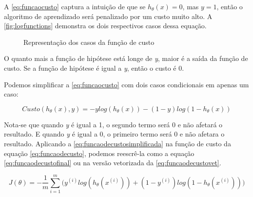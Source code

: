 A \autoref{eq:funcaocusto} captura a intuição de que se $h_\theta(x) = 0$, mas $y = 1$, então o algoritmo de aprendizado será penalizado por um custo muito alto. A \autoref{fig:logfunctions} demonstra os dois respectivos casos dessa equação.


\begin{figure}[!htb]
  \caption{Representação dos casos da função de custo}
  \label{fig:logfunctions}
  \begin{center}
  \end{center}
\end{figure}


O quanto mais a função de hipótese está longe de \textit{y}, maior é a saída da função de custo. Se a função de hipótese é igual a \textit{y}, então o custo é 0.

Podemos simplificar a \autoref{eq:funcaocusto} com dois casos condicionais em apenas um caso:

\begin{equation} 
\label{eq:funcaodecustosimplificada}
Custo(h_{\theta}(x), y) = -ylog(h_{\theta}(x)) - (1-y)log(1 - h_{\theta}(x))
\end{equation}

Nota-se que quando \textit{y} é igual a 1, o segundo termo será 0 e não afetará o resultado. E quando \textit{y} é igual a 0, o primeiro termo será 0 e não afetara o resultado. Aplicando a \autoref{eq:funcaodecustosimplificada} na função de custo da equação \autoref{eq:funcaodecusto}, podemos reescrê-la como a equação \autoref{eq:funcaodecustofinal} ou na versão vetorizada da \autoref{eq:funcaodecustovet}.

\begin{equation}
\label{eq:funcaodecustofinal}
J(\theta) = - \frac{1}{m}\sum\limits_{i=1}^{m}\Big( y^{(i)}log(h_{\theta}(x^{(i)})) + (1-y^{(i)})log(1 - h_{\theta}(x^{(i)})) \Big)
\end{equation}

